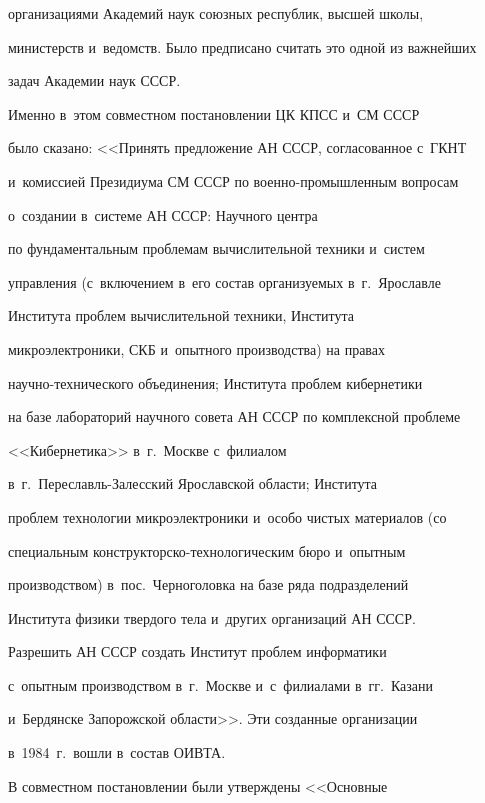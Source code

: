 организациями Академий наук союзных рес\-пуб\-лик, выс\-шей школы, 

министерств и~ведомств. Было предписано считать это одной из важ\-ней\-ших 

задач Академии наук \mbox{СССР}. 

   

   Именно в~этом совместном постановлении ЦК \mbox{КПСС} и~СМ \mbox{СССР} 

было сказано: <<Принять предложение АН СССР, согласованное с~ГКНТ 

и~комиссией Президиума СМ \mbox{СССР} по во\-ен\-но-про\-мыш\-лен\-ным вопросам 

о~создании в~сис\-те\-ме АН \mbox{СССР}: Научного центра 

по фундаментальным проб\-ле\-мам вы\-чис\-ли\-тель\-ной техники и~сис\-тем  

управ\-ле\-ния (с~включением в~его со\-став организуемых в~г.~Яро\-слав\-ле 

Института проб\-лем вы\-чис\-ли\-тел\-ьной техники, Института 

микроэлектроники, СКБ и~опыт\-но\-го производства) на правах  

на\-уч\-но-тех\-ни\-че\-ского объединения; Института проб\-лем кибернетики 

на базе лабораторий научного совета АН СССР по комплексной проб\-ле\-ме 

<<Кибернетика>> в~г.~Моск\-ве с~филиалом  

в~г.~Пе\-ре\-славль-За\-лес\-ский Ярославской об\-ласти; Института  

проб\-лем технологии мик\-ро\-элект\-ро\-ни\-ки и~особо чис\-тых материалов (со 

специальным конст\-рук\-торско-тех\-но\-ло\-ги\-че\-ским бюро и~опыт\-ным 

производством) в~пос.~Чер\-но\-го\-лов\-ка на базе ряда подразделений 

Института физики твер\-до\-го тела и~других организаций АН \mbox{СССР}. 

Разрешить АН \mbox{СССР} создать Институт проб\-лем информатики 

с~опыт\-ным производством в~г.~Моск\-ве и~с~филиалами в~гг.~Казани 

и~Бердянске За\-по\-рож\-ской об\-ласти>>. Эти созданные организации 

в~1984~г.\ во\-шли в~со\-став \mbox{ОИВТА}.

    

   В совместном постановлении были утверж\-де\-ны <<Основ\-ные 

